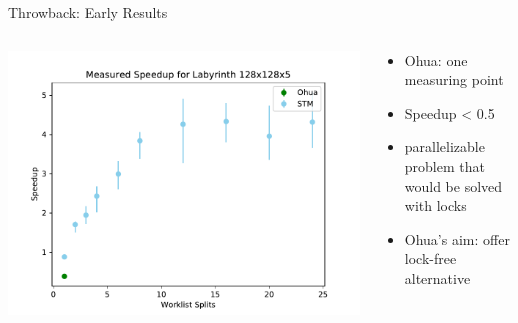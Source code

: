 \documentclass[aspectratio=169, usenames, dvipsnames]{beamer}
\begin{document}
\begin{frame}{Throwback: Early Results}
  \begin{columns}
    \begin{column}{0.55\textwidth}
      \centering
      \includegraphics[width=\textwidth,height=.7\textheight,keepaspectratio]{img/2019-04-18-128x128x5}
    \end{column}
    \begin{column}{0.45\textwidth}
      \begin{itemize}
        \item Ohua: one measuring point
        \item Speedup < 0.5\\[.9\baselineskip]
        \item<2-> parallelizable problem that would be solved with locks
        \item<2-> Ohua's aim: offer lock-free alternative
      \end{itemize}
    \end{column}
  \end{columns}
\end{frame}
\end{document}
